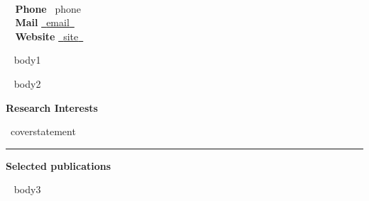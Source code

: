 \documentclass[a4paper]{article}
\newcommand{\block}[1]{\hrule \vspace{0.2cm} \textbf{\Large #1} \vspace{0.2cm}}
\newcommand{\blockNp}[1]{\newpage \textbf{\Large #1} \vspace{0.2cm}}
\newcommand{\skill}[2]{\textbf{#1} \hfill #2 \\}
\begin{document}
\begin{minipage}[c]{0.6\columnwidth}
    \\
\end{minipage} 
\hfill
\begin{minipage}[t]{0.375\columnwidth}
    \skill{\faPhone~ Phone}{~{{phone}}~}
    \skill{\faEnvelope~ Mail}{\href{mailto:~{{email}}~}{~{{email}}~}}
    \skill{\faGlobe~ Website}{\href{~{{site}}~}{~{{site}}~}}
\end{minipage}
\vspace{-0.25em}



\begin{minipage}[t]{0.6\columnwidth}
    ~{{ body1 }}~
\end{minipage} 
\hfill
\begin{minipage}[t]{0.375\columnwidth}
    ~{{ body2 }}~
\end{minipage}


\blockNp{Research Interests}

{~{{coverstatement}}~}

\vspace{0.3cm}

\block{Selected publications}
\nocite{Blacker2022,Miti2022,Miti2019,Miti2019a}
\printbibliography[heading=none]
\vspace{.5em}

~{{ body3 }}~
\end{document}
